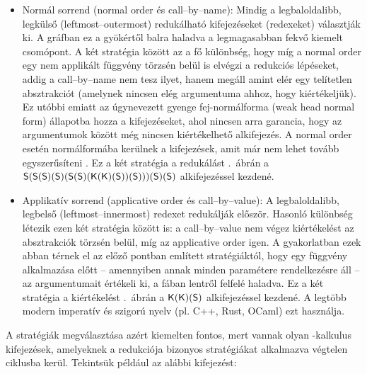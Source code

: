 \documentclass[a4paper,oneside,12pt]{article}
\begin{document}
\begin{itemize}
  \item Normál sorrend (\foreignlanguage{english}{normal order} és \foreignlanguage{english}{call--by--name}): Mindig a legbaloldalibb, legkülső (\foreignlanguage{english}{leftmost--outermost}) redukálható kifejezéseket (redexeket) választják ki. A gráfban ez a gyökértől balra haladva a legmagasabban fekvő kiemelt csomópont. A két stratégia között az a fő különbség, hogy míg a \foreignlanguage{english}{normal order} egy nem applikált függvény törzsén belül is elvégzi a redukciós lépéseket, addig a \foreignlanguage{english}{call--by--name} nem tesz ilyet, hanem megáll amint elér egy telítetlen absztrakciót (amelynek nincsen elég argumentuma ahhoz, hogy kiértékeljük). Ez utóbbi emiatt az úgynevezett gyenge fej-normálforma (\foreignlanguage{english}{weak head normal form}) \cite{Lambdakalkulus2007} állapotba hozza a kifejezéseket, ahol nincsen arra garancia, hogy az argumentumok között még nincsen kiértékelhető alkifejezés. A \foreignlanguage{english}{normal order} esetén normálformába kerülnek a kifejezések, amit már nem lehet tovább egyszerűsíteni \cite{pierceTypesProgrammingLanguages2002a}. Ez a két stratégia a redukálást .~ábrán a $\textsf{S}(\textsf{S}(\textsf{S})(\textsf{S})(\textsf{S}(\textsf{S})(\textsf{K}(\textsf{K})(\textsf{S}))(\textsf{S})))(\textsf{S})(\textsf{S})$ alkifejezéssel kezdené.
  \item Applikatív sorrend (\foreignlanguage{english}{applicative order} és \foreignlanguage{english}{call--by--value}): A legbaloldalibb, legbelső (\foreignlanguage{english}{leftmost--innermost}) redexet redukálják először. Hasonló különbség létezik ezen két stratégia között is: a \foreignlanguage{english}{call--by--value} nem végez kiértékelést az absztrakciók törzsén belül, míg az \foreignlanguage{english}{applicative order} igen. A gyakorlatban ezek abban térnek el az előző pontban említett stratégiáktól, hogy egy függvény alkalmazása előtt -- amennyiben annak minden paramétere rendelkezésre áll -- az argumentumait értékeli ki, a fában lentről felfelé haladva. Ez a két stratégia a kiértékelést .~ábrán a $\textsf{K}(\textsf{K})(\textsf{S})$ alkifejezéssel kezdené. A legtöbb modern imperatív és szigorú nyelv (pl. C++, Rust, OCaml) ezt használja.
\end{itemize}

A stratégiák megválasztása azért kiemelten fontos, mert vannak olyan \ski-kalkulus kifejezések, amelyeknek a redukciója bizonyos stratégiákat alkalmazva végtelen ciklusba kerül. Tekintsük például az alábbi kifejezést:
\end{document}
